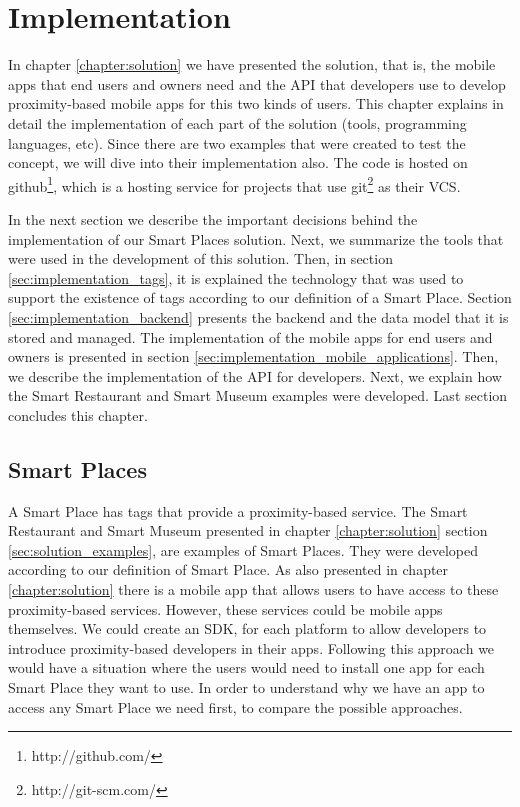 
\chapter{Implementation}
\label{chapter:implementation}
In chapter \ref{chapter:solution} we have presented the solution, that is,
the mobile apps that end users and owners need and the \gls{API} that developers use
to develop proximity-based mobile apps for this two kinds of users.
This chapter explains in detail the implementation of each part of the solution
(tools, programming languages, etc). Since there are two examples that were
created to test the concept, we will dive into their implementation also.
The code is hosted on
github\footnote{http://github.com/}, which is a hosting service for projects
that use git\footnote{http://git-scm.com/} as their \gls{VCS}.

In the next section we describe the important decisions behind the implementation of our Smart Places solution.
Next, we summarize the tools that were used in the development of this solution.
Then, in section \ref{sec:implementation_tags}, it is explained the technology that was used to support the existence of tags according to our definition of a Smart Place.
Section \ref{sec:implementation_backend} presents the backend and the data model that it is stored and managed.
The implementation of the mobile apps for end users and owners is presented in section \ref{sec:implementation_mobile_applications}.
Then, we describe the implementation of the \gls{API} for developers.
Next, we explain how the Smart Restaurant and Smart Museum examples were developed.
Last section concludes this chapter.

\section{Smart Places}
\label{sec:implementation_smart_places}
A Smart Place has tags that provide a proximity-based service.
The Smart Restaurant and Smart Museum presented in chapter \ref{chapter:solution} section \ref{sec:solution_examples}, are examples of Smart Places.
They were developed according to our definition of Smart Place.
As also presented in chapter \ref{chapter:solution} there is a mobile app that allows users to have access to these proximity-based services.
However, these services could be mobile apps themselves.
We could create an \gls{SDK}, for each platform to allow developers to introduce proximity-based developers in their apps.
Following this approach we would have a situation where the users would need to install one app for each Smart Place they want to use.
In order to understand why we have an app to access any Smart Place we need first, to compare the possible approaches.

